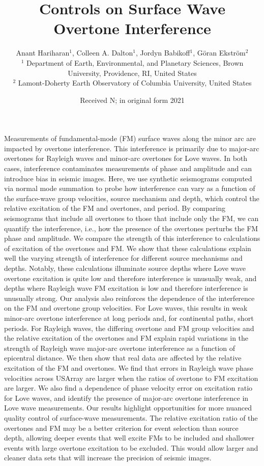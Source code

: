 \documentclass[extra,mreferee]{gji}
\title[Controls on Surface Wave Overtone Interference]
  {Controls on Surface Wave Overtone Interference}
\author[Hariharan et al.]
  {Anant Hariharan$^1$, Colleen A. Dalton$^1$,  Jordyn Babikoff$^1$, G{\"o}ran Ekstr{\"o}m$^2$ \\
  $^1$ Department of Earth, Environmental, and Planetary Sciences, Brown University, Providence, RI, United States\\
  $^2$ Lamont-Doherty Earth Observatory of Columbia University, United States}
\date{Received N; in original form 2021 }
\begin{document}
\label{firstpage}

\maketitle


\begin{summary}
Measurements of fundamental-mode (FM) surface waves along the minor arc are impacted by overtone interference. This interference is primarily due to major-arc overtones for Rayleigh waves and minor-arc overtones for Love waves. In both cases, interference contaminates measurements of phase and amplitude and can introduce bias in seismic images. Here, we use synthetic seismograms computed via normal mode summation to probe how interference can vary as a function of the surface-wave group velocities, source mechanism and depth, which control the relative excitation of the FM and overtones, and period. By comparing seismograms that include all overtones to those that include only the FM, we can quantify the interference, i.e., how the presence of the overtones perturbs the FM phase and amplitude. We compare the strength of this interference to calculations of excitation of the overtones and FM. We show that these calculations explain well the varying strength of interference for different source mechanisms and depths. Notably, these calculations illuminate source depths where Love wave overtone excitation is quite low and therefore interference is unusually weak, and depths where Rayleigh wave FM excitation is low and therefore interference is unusually strong. Our analysis also reinforces the dependence of the interference on the FM and overtone group velocities. For Love waves, this results in weak minor-arc overtone interference at long periods and, for continental paths, short periods. For Rayleigh waves, the differing overtone and FM group velocities and the relative excitation of the overtones and FM explain rapid variations in the strength of Rayleigh wave major-arc overtone interference as a function of epicentral distance. We then show that real data are affected by the relative excitation of the FM and overtones. We find that errors in Rayleigh wave phase velocities across USArray are larger when the ratios of overtone to FM excitation are larger. We also find a dependence of phase velocity error on excitation ratio for Love waves, and identify the presence of major-arc overtone interference in Love wave measurements. Our results highlight opportunities for more nuanced quality control of surface-wave measurements. The relative excitation ratio of the overtones and FM may be a better criterion for event selection than source depth, allowing deeper events that well excite FMs to be included and shallower events with large overtone excitation to be excluded. This would allow larger and cleaner data sets that will increase the precision of seismic images.
\end{summary}
\end{document}
